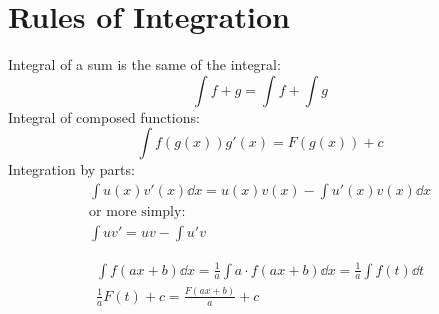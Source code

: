 \documentclass[00_complete]{subfiles}
\begin{document}
\section{Rules of Integration}

Integral of a sum is the same of the integral:
\begin{equation}
    \int f + g = \int f + \int g
\end{equation}
Integral of composed functions:
\begin{equation}
    \int f(g(x))g'(x) = F(g(x)) + c
\end{equation}
Integration by parts:
\begin{equation}
\begin{gathered}
    \int u(x)v'(x)\dd{x} = u(x)v(x) - \int u'(x)v(x)\dd{x} \\
    \text{or more simply:} \\
    \int uv' = uv - \int u'v
\end{gathered}
\end{equation}
\begin{example}
    $$
    \begin{gathered}
        \int f(ax+b)\dd{x} = \frac{1}{a} \int a\cdot f(ax+b)\dd{x} =
        \frac{1}{a} \int f(t)\dd{t}
        \\
        \frac{1}{a}F(t)+c = \frac{F(ax+b)}{a}+c
    \end{gathered}
    $$
\end{example}
\end{document}
